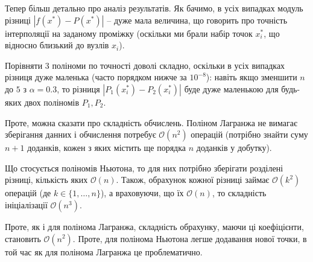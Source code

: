 \documentclass[12pt]{extarticle}
\begin{document}
Тепер більш детально про аналіз результатів. Як бачимо, в усіх випадках модуль різниці $|f(x^*)-P(x^*)|$ -- дуже мала величина, що говорить про точність інтерполяції на заданому проміжку (оскільки ми брали набір точок $x^*_i$, що відносно близький до вузлів $x_i$).

Порівняти 3 поліноми по точності доволі складно, оскільки в усіх випадках різниця дуже маленька (часто порядком нижче за $10^{-8}$): навіть якщо зменшити $n$ до $5$ з $\alpha=0.3$, то різниця $|P_1(x^*_i)-P_2(x^*_i)|$ буде дуже маленькою для будь-яких двох поліномів $P_1, P_2$.

Проте, можна сказати про складність обчислень. Поліном Лагранжа не вимагає зберігання данних і обчислення потребує $\mathcal{O}(n^2)$ операцій (потрібно знайти суму $n+1$ доданків, кожен з яких містить ще порядка $n$ доданків у добутку). 

Що стосується поліномів Ньютона, то для них потрібно зберігати розділені різниці, кількість яких $\mathcal{O}(n)$. Також, обрахунок кожної різниці займає $\mathcal{O}(k^2)$ операцій (де $k \in \{1,\dots,n\}$), а враховуючи, що їх $\mathcal{O}(n)$, то складність ініціалізації $\mathcal{O}(n^3)$.

Проте, як і для полінома Лагранжа, складність обрахунку, маючи ці коефіцієнти, становить $\mathcal{O}(n^2)$. Проте, для полінома Ньютона легше додавання нової точки, в той час як для полінома Лагранжа це проблематично.
\end{document}
